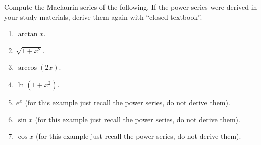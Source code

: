 Compute the Maclaurin series of the following. If the power series were derived in your study materials, derive them again with ``closed textbook''. 
\begin{enumerate}
\item $\arctan x $.
\item $\sqrt{1+x^2}$.
\item $\arccos (2x)$.
\item $\ln (1+x^2)$.
\item $e^x$ (for this example just recall the power series, do not derive them).
\item $\sin x$ (for this example just recall the power series, do not derive them).
\item $\cos x$ (for this example just recall the power series, do not derive them).
\end{enumerate}

